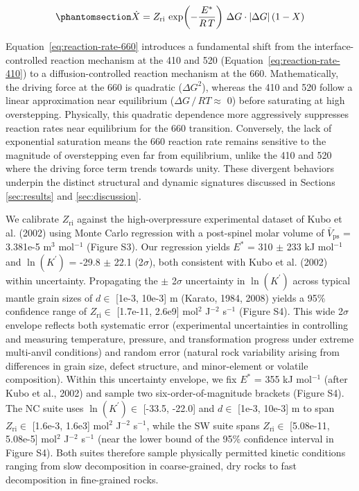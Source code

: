\documentclass[draft,linenumbers]{agujournal2019}
\begin{document}
\begin{equation}\protect\phantomsection\label{eq:reaction-rate-660}{\dot{X} = Z_\mathrm{ri}\, \exp\!\left(-\frac{E^{\ast}}{R\, T}\right)\, \Delta G \cdot |\Delta G| \left(1 - X \right)}\end{equation}

Equation~\ref{eq:reaction-rate-660} introduces a fundamental shift from
the interface-controlled reaction mechanism at the 410 and 520
(Equation~\ref{eq:reaction-rate-410}) to a diffusion-controlled reaction
mechanism at the 660. Mathematically, the driving force at the 660 is
quadratic (\(\Delta G^2\)), whereas the 410 and 520 follow a linear
approximation near equilibrium (\(\Delta G\,/\,RT \approx\) 0) before
saturating at high overstepping. Physically, this quadratic dependence
more aggressively suppresses reaction rates near equilibrium for the 660
transition. Conversely, the lack of exponential saturation means the 660
reaction rate remains sensitive to the magnitude of overstepping even
far from equilibrium, unlike the 410 and 520 where the driving force
term trends towards unity. These divergent behaviors underpin the
distinct structural and dynamic signatures discussed in Sections
\ref{sec:results} and \ref{sec:discussion}.

We calibrate \(Z_\mathrm{ri}\) against the high-overpressure
experimental dataset of Kubo et al. (2002) using Monte Carlo regression
with a post-spinel molar volume of \(\bar{V}_\mathrm{ps}\) = 3.381e-5
m\(^3\) mol\(^{-1}\) (Figure S3). Our regression yields \(E^{\ast}\) =
310 \(\pm\) 233 kJ mol\(^{-1}\) and \(\ln(K^{\prime})\) = -29.8 \(\pm\)
22.1 (2\(\sigma\)), both consistent with Kubo et al. (2002) within
uncertainty. Propagating the \(\pm\) 2\(\sigma\) uncertainty in
\(\ln(K^{\prime})\) across typical mantle grain sizes of \(d \in\)
{[}1e-3, 10e-3{]} m (Karato, 1984, 2008) yields a 95\% confidence range
of \(Z_\mathrm{ri} \in\) {[}1.7e-11, 2.6e9{]} mol\(^2\) J\(^{-2}\)
s\(^{-1}\) (Figure S4). This wide 2\(\sigma\) envelope reflects both
systematic error (experimental uncertainties in controlling and
measuring temperature, pressure, and transformation progress under
extreme multi-anvil conditions) and random error (natural rock
variability arising from differences in grain size, defect structure,
and minor-element or volatile composition). Within this uncertainty
envelope, we fix \(E^{\ast}\) = 355 kJ mol\(^{-1}\) (after Kubo et al.,
2002) and sample two six-order-of-magnitude brackets (Figure S4). The NC
suite uses \(\ln(K^{\prime}) \in\) {[}-33.5, -22.0{]} and \(d \in\)
{[}1e-3, 10e-3{]} m to span \(Z_\mathrm{ri} \in\) {[}1.6e-3, 1.6e3{]}
mol\(^2\) J\(^{-2}\) s\(^{-1}\), while the SW suite spans
\(Z_\mathrm{ri} \in\) {[}5.08e-11, 5.08e-5{]} mol\(^2\) J\(^{-2}\)
s\(^{-1}\) (near the lower bound of the 95\% confidence interval in
Figure S4). Both suites therefore sample physically permitted kinetic
conditions ranging from slow decomposition in coarse-grained, dry rocks
to fast decomposition in fine-grained rocks.
\end{document}
